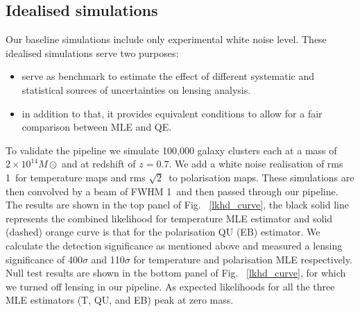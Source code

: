  \subsection{Idealised simulations}
 \label{sec_ideal_sims}
 Our baseline simulations include only experimental white noise level.
 These idealised simulations serve two purposes: 
 \begin{itemize}
 \item serve as benchmark to estimate the effect of different systematic and statistical sources of uncertainties on lensing analysis. 
 \item in addition to that, it provides equivalent conditions to allow for a fair comparison between MLE and QE.
\end{itemize}
 To validate the pipeline we simulate 100,000 galaxy clusters each at a mass of $2 \times10^{14} M{\odot}$ and at redshift of $z = 0.7$.
 We add a white noise realisation of rms 1\ukam\ for temperature maps and  rms $\sqrt{2}$\ukam\ to polarisation maps. 
 These simulations are then convolved by a beam of FWHM 1\am\ and then passed through our pipeline.
 The results are shown in the top panel of Fig. ~\ref{lkhd_curve}, the black solid line represents the combined likelihood for temperature MLE estimator and solid (dashed) orange curve is that for the polarisation QU (EB) estimator.%
 We calculate the detection significance as mentioned above and measured a lensing significance of 400$\sigma$ and 110$\sigma$ for temperature and polarisation MLE respectively. 
 Null test results are shown in the bottom panel of Fig. ~\ref{lkhd_curve}, for which we turned off lensing in our pipeline.
 As expected likelihoods for all the three MLE estimators (T, QU, and EB) peak at zero mass.
 
